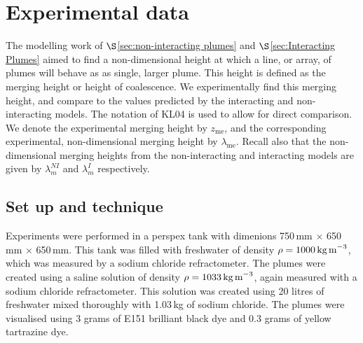 \documentclass{jfm}
\begin{document}
	\section{Experimental data}
	The modelling work of $\S$\ref{sec:non-interacting plumes}  and $\S$\ref{sec:Interacting Plumes} aimed to find a non-dimensional height at which a line, or array, of plumes will behave as as single, larger plume. This height is defined as the merging height or height of coalescence. We experimentally find this merging height, and compare to the values predicted by the interacting and non-interacting models. The notation of KL04 is used to allow for direct comparison. We denote the experimental merging height by $z_{\text{me}}$, and the corresponding experimental, non-dimensional merging height by $\lambda_{\text{me}}$. Recall also that the non-dimensional merging heights from the non-interacting and interacting models are given by $\lambda_{m}^{NI}$ and $\lambda_{m}^I$ respectively.
	
	\subsection{Set up and technique}
	Experiments were performed in a perspex tank with dimenions 750\,mm $\times$ 650\,mm $\times$  650\,mm. This tank was filled with freshwater of density $\rho = 1000\,\text{kg\,m}^{-3}$, which was measured by a sodium chloride refractometer. The plumes were created using a saline solution of density $\rho = 1033\,\text{kg\,m}^{-3}$, again measured with a sodium chloride refractometer. This solution was created using 20 litres of freshwater mixed thoroughly with 1.03\,kg of sodium chloride. The plumes were visualised using 3 grams of E151 brilliant black dye and 0.3 grams of yellow tartrazine dye.\\
\end{document}
